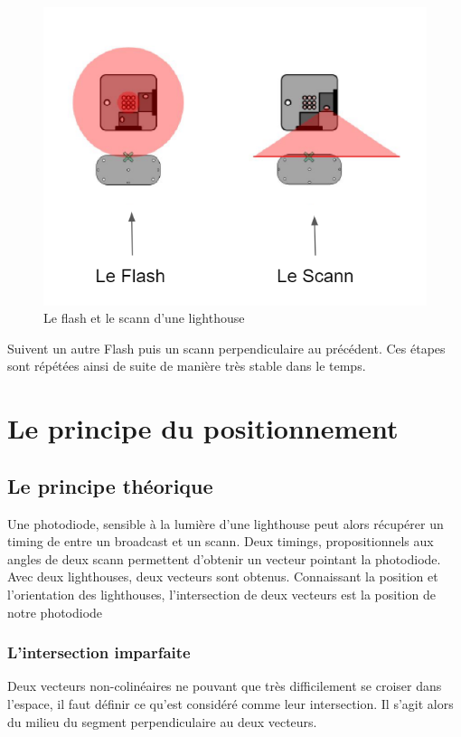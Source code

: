 \documentclass[10pt]{report}
\begin{document}
\begin{figure}[h]
	\centering
	\includegraphics[scale=0.6]{Flash_scan.PNG}
	\caption{Le flash et le scann d'une lighthouse}
\end{figure}

Suivent un autre Flash puis un scann perpendiculaire au précédent. Ces étapes sont répétées ainsi de suite de manière très stable dans le temps.

\section{Le principe du positionnement}

\subsection{Le principe théorique}

Une photodiode, sensible à la lumière d'une lighthouse peut alors récupérer un timing de entre un broadcast et un scann. Deux timings, propositionnels aux angles de deux scann permettent d'obtenir un vecteur pointant la photodiode. Avec deux lighthouses, deux vecteurs sont obtenus. Connaissant la position et l'orientation des lighthouses, l'intersection de deux vecteurs est la position de notre photodiode

\subsubsection{L'intersection imparfaite}

Deux vecteurs non-colinéaires ne pouvant que très difficilement se croiser dans l'espace, il faut définir ce qu'est considéré comme leur intersection. Il s'agit alors du milieu du segment perpendiculaire au deux vecteurs.
\end{document}
